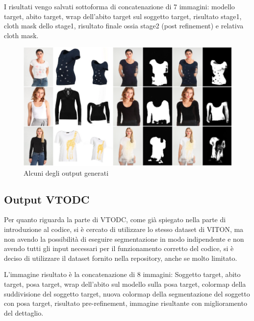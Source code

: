 \documentclass[final, 11pt]{article}
\begin{document}
	I risultati vengo salvati sottoforma di concatenazione di 7 immagini: modello target, abito target, wrap dell'abito target sul soggetto target, risultato stage1, cloth mask dello stage1, risultato finale ossia stage2 (post refinement) e relativa cloth mask.
	
	\begin{figure}[!htb]
		\centering
		\includegraphics[width=\linewidth]{vitonres1_1.png}
		\caption{Alcuni degli output generati}
	\end{figure} 
	
	\subsection{Output VTODC}
	Per quanto riguarda la parte di VTODC, come già spiegato nella parte di introduzione al codice, si è cercato di utilizzare lo stesso dataset di VITON, ma non avendo la possibilità di eseguire segmentazione in modo indipendente e non avendo tutti gli input necessari per il funzionamento corretto del codice, si è deciso di utilizzare il dataset fornito nella repository, anche se molto limitato.
	
	L’immagine risultato è la concatenazione di 8 immagini: Soggetto target, abito target, posa target, wrap dell’abito sul modello sulla posa target, colormap della suddivisione del soggetto target, nuova colormap della segmentazione del soggetto con posa target, risultato pre-refinement, immagine risultante con miglioramento del dettaglio.
	
\end{document}
